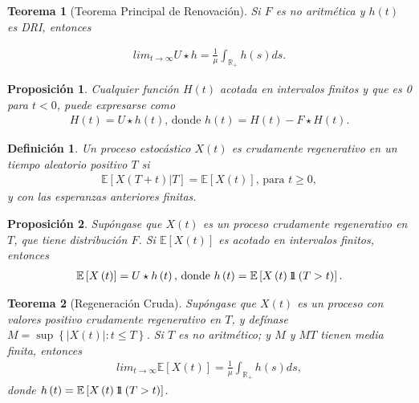 \documentclass{article}
\newtheorem{Def}{Definición}[section]
\newtheorem{Teo}{Teorema}[section]
\newtheorem{Prop}{Proposición}[section]
\newcommand{\rea}{\mathbb{R}}
\newcommand{\esp}{\mathbb{E}}
\newcommand{\indora}{\mbox{$1$\hspace{-0.8ex}$1$}}
\numberwithin{equation}{section}
\begin{document}
\begin{Teo}[Teorema Principal de Renovaci\'on]
Si $F$ es no aritm\'etica y $h\left(t\right)$ es DRI, entonces

\begin{eqnarray}
lim_{t\rightarrow\infty}U\star h=\frac{1}{\mu}\int_{\rea_{+}}h\left(s\right)ds.
\end{eqnarray}
\end{Teo}

\begin{Prop}
Cualquier funci\'on $H\left(t\right)$ acotada en intervalos finitos y que es 0 para $t<0$, puede expresarse como
\begin{eqnarray}
H\left(t\right)=U\star h\left(t\right)\textrm{,  donde }h\left(t\right)=H\left(t\right)-F\star H\left(t\right).
\end{eqnarray}
\end{Prop}

\begin{Def}
Un proceso estoc\'astico $X\left(t\right)$ es crudamente regenerativo en un tiempo aleatorio positivo $T$ si
\begin{eqnarray}
\esp\left[X\left(T+t\right)|T\right]=\esp\left[X\left(t\right)\right]\textrm{, para }t\geq0,\end{eqnarray}
y con las esperanzas anteriores finitas.
\end{Def}

\begin{Prop}
Sup\'ongase que $X\left(t\right)$ es un proceso crudamente regenerativo en $T$, que tiene distribuci\'on $F$. Si $\esp\left[X\left(t\right)\right]$ es acotado en intervalos finitos, entonces
\begin{eqnarray}
\esp\left[X\left(t\right)\right]=U\star h\left(t\right)\textrm{,  donde }h\left(t\right)=\esp\left[X\left(t\right)\indora\left(T>t\right)\right].
\end{eqnarray}
\end{Prop}

\begin{Teo}[Regeneraci\'on Cruda]
Sup\'ongase que $X\left(t\right)$ es un proceso con valores positivo crudamente regenerativo en $T$, y def\'inase $M=\sup\left\{|X\left(t\right)|:t\leq T\right\}$. Si $T$ es no aritm\'etico; y $M$ y $MT$ tienen media finita, entonces
\begin{eqnarray}
lim_{t\rightarrow\infty}\esp\left[X\left(t\right)\right]=\frac{1}{\mu}\int_{\rea_{+}}h\left(s\right)ds,
\end{eqnarray}
donde $h\left(t\right)=\esp\left[X\left(t\right)\indora\left(T>t\right)\right]$.
\end{Teo}
\end{document}
